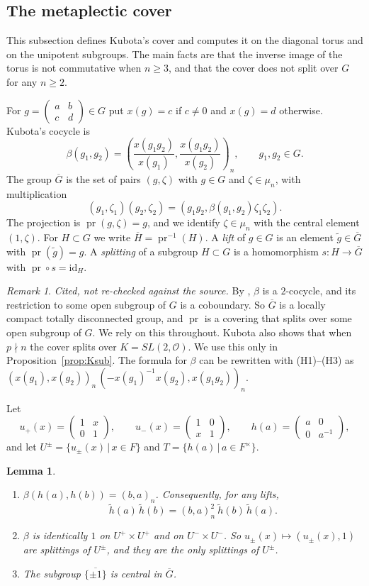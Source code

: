 \documentclass[12pt,letterpaper]{amsart}
\numberwithin{equation}{section}
\newtheorem{lemma}[theorem]{Lemma}
\theoremstyle{definition}
\theoremstyle{remark}
\newtheorem{vremark}{Remark}
\DeclareMathOperator{\pr}{pr}
\newcommand{\cO}{\mathcal{O}}
\newcommand{\Gbar}{\overline{G}}
\newcommand{\mat}[4]{\begin{pmatrix} #1 & #2\\ #3 & #4\end{pmatrix}}
\begin{document}
\subsection{The metaplectic cover}
\label{subsec:cover}
This subsection defines Kubota's cover and computes it on the diagonal
torus and on the unipotent subgroups. The main facts are that the
inverse image of the torus is not commutative when $n\geq 3$, and that
the cover does not split over $G$ for any $n\geq 2$.

For $g=\mat abcd\in G$ put $x(g)=c$ if $c\neq 0$ and $x(g)=d$
otherwise. Kubota's cocycle is
\[
\beta(g_1,g_2)=\left(\frac{x(g_1g_2)}{x(g_1)},
\frac{x(g_1g_2)}{x(g_2)}\right)_n,\qquad g_1,g_2\in G.
\]
The group $\Gbar$ is the set of pairs $(g,\zeta)$ with $g\in G$ and
$\zeta\in\mu_n$, with multiplication
\[
(g_1,\zeta_1)(g_2,\zeta_2)=(g_1g_2,\beta(g_1,g_2)\zeta_1\zeta_2).
\]
The projection is $\pr(g,\zeta)=g$, and we identify $\zeta\in\mu_n$
with the central element $(1,\zeta)$. For $H\subset G$ we write
$\overline{H}=\pr^{-1}(H)$. A \emph{lift} of $g\in G$ is an element
$\tilde g\in\Gbar$ with $\pr(\tilde g)=g$. A \emph{splitting} of a
subgroup $H\subset G$ is a homomorphism $s:H\to\Gbar$ with
$\pr\circ s=\mathrm{id}_H$.

\begin{vremark}
\label{vrem:kubota}
\emph{Cited, not re-checked against the source.} By \cite[\S1]{Ku67},
$\beta$ is a $2$-cocycle, and its restriction to some open subgroup of
$G$ is a coboundary. So $\Gbar$ is a locally compact totally
disconnected group, and $\pr$ is a covering that splits over some open
subgroup of $G$. We rely on this throughout. Kubota also shows that when
$p\nmid n$ the cover splits over $K=SL(2,\cO)$. We use this only in
Proposition~\ref{prop:Ksub}. The formula for $\beta$
can be rewritten with (H1)--(H3) as
$(x(g_1),x(g_2))_n\,(-x(g_1)^{-1}x(g_2),x(g_1g_2))_n$.
\end{vremark}

Let
\[
u_+(x)=\mat 1x01,\qquad u_-(x)=\mat 10x1,\qquad h(a)=\mat a00{a^{-1}},
\]
and let $U^\pm=\{u_\pm(x)\,|\,x\in F\}$ and
$T=\{h(a)\,|\,a\in F^\times\}$.

\begin{lemma}
\label{lemma:cover}
\begin{enumerate}[leftmargin=2em,label=(\alph*)]
\item $\beta(h(a),h(b))=(b,a)_n$. Consequently, for any lifts,
\[
\tilde h(a)\,\tilde h(b)=(b,a)_n^2\ \tilde h(b)\,\tilde h(a).
\]
\item $\beta$ is identically $1$ on $U^+\times U^+$ and on
$U^-\times U^-$. So $u_\pm(x)\mapsto (u_\pm(x),1)$ are splittings of
$U^\pm$, and they are the only splittings of $U^\pm$.
\item The subgroup $\overline{\{\pm 1\}}$ is central in $\Gbar$.
\end{enumerate}
\end{lemma}
\end{document}
